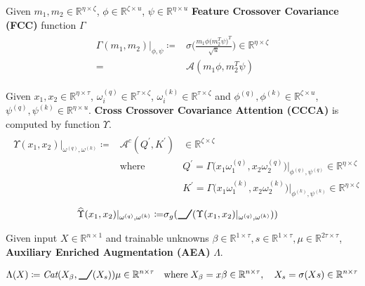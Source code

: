 \documentclass{article}
\newcommand{\ReLU}{
	\begin{tikzpicture}[baseline=-0.5ex]
		\draw[thick] (0,-0.13) -- (0.3,-0.13) -- (0.5,0.2);
	\end{tikzpicture}
}
\begin{document}
\begin{tcolorbox}
Given $m_{1}, m_{2} \in \mathbb{R}^{\eta \times \zeta}$, $\phi\in \mathbb{R}^{\zeta\times u}$, $\psi \in \mathbb{R}^{\eta\times u}$  \textbf{Feature Crossover Covariance (FCC)} function $\Gamma$
\begin{eqnarray*}
	\begin{aligned}
	\Gamma(m_{1}, m_{2})\vert_{\phi, \psi} \coloneqq& \sigma\Bigg(\frac{m_{1}\phi \Big(m_{2}^{T}\psi\Big)^{T} }{\sqrt{u}}\Bigg) \in \mathbb{R}^{\eta\times \zeta} \\
	=& \mathcal{A}(m_{1}\phi, m_{2}^{T}\psi)
	\end{aligned}
\end{eqnarray*}
\end{tcolorbox}


\begin{tcolorbox}
Given $x_{1}, x_{2} \in \mathbb{R}^{\eta \times \tau}$, $\omega^{(q)}_{i} \in \mathbb{R}^{\tau \times \zeta}$, $\omega^{(k)}_{i} \in \mathbb{R}^{\tau \times \zeta}$ and $\phi^{(q)}, \phi^{({k})} \in \mathbb{R}^{\zeta \times u}$, $\psi^{(q)}, \psi^{({k})} \in \mathbb{R}^{\eta \times u}$. \textbf{Cross Crossover Covariance Attention (CCCA)} is computed by function $\Upsilon$.
\begin{eqnarray*}
	\begin{aligned}
	\Upsilon(x_{1}, x_{2})\vert_{\omega^{(q)}, \omega^{(k)}}\coloneqq&\mathcal{A}^{c}(Q^{\prime}, K^{\prime}) & \in \mathbb{R}^{\zeta\times \zeta} \\
	& \text{where} & Q^{\prime} = \Gamma\Big(x_{1} \omega^{(q)}_{1}, x_{2} \omega^{(q)}_{2}\Big) \vert_{\phi^{(q)}, \psi^{(q)}} \in \mathbb{R}^{\eta\times \zeta} \\
	& & K^{\prime} = \Gamma\Big(x_{1} \omega^{(k)}_{1}, x_{2} \omega^{(k)}_{2}\Big) \vert_{\phi^{(k)}, \psi^{(k)}} \in \mathbb{R}^{\eta\times \zeta}
	\end{aligned}
\end{eqnarray*}
\begin{eqnarray*}
	\begin{aligned}
	\widehat{\Upsilon}(x_{1}, x_{2})\vert_{\omega^{(q)}, \omega^{(k)}}\coloneqq& \sigma_{g}(\ReLU(\Upsilon(x_{1}, x_{2})\vert_{\omega^{(q)}, \omega^{(k)}})) &
	\end{aligned}
\end{eqnarray*}
\end{tcolorbox}

\begin{tcolorbox}

Given input $X \in \mathbb{R}^{n \times 1}$ and trainable unknowns $\beta \in \mathbb{R}^{1 \times \tau}, s \in \mathbb{R}^{1 \times \tau}, \mu \in \mathbb{R}^{2\tau \times \tau}$, \textbf{Auxiliary Enriched Augmentation (AEA)} $\Lambda$.

\begin{equation*}
	\Lambda(X) \coloneqq \textit{Cat}(X_{\beta}, \ReLU(X_{s}))\mu \in \mathbb{R}^{n\times \tau} \quad \text{where}\; X_{\beta} = x \beta \in \mathbb{R}^{n \times \tau}, \quad X_{s} = \sigma(X s) \in \mathbb{R}^{n \times \tau}
\end{equation*}
\end{tcolorbox}
\end{document}
